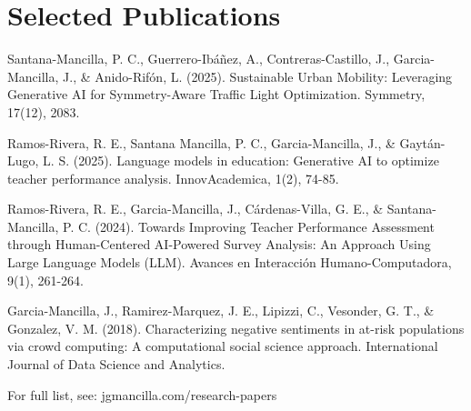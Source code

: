 \documentclass[letterpaper,10pt]{article}
\newcommand{\resumeSubHeadingListStart}{\begin{itemize}[leftmargin=0.15in, label={}]}
\newcommand{\resumeSubHeadingListEnd}{\end{itemize}}
\begin{document}
\section{Selected Publications}
  \resumeSubHeadingListStart
    \small{\item{
      {Santana-Mancilla, P. C., Guerrero-Ibáñez, A., Contreras-Castillo, J., Garcia-Mancilla, J., \& Anido-Rifón, L. (2025). Sustainable Urban Mobility: Leveraging Generative AI for Symmetry-Aware Traffic Light Optimization. Symmetry, 17(12), 2083.}
      
      {Ramos-Rivera, R. E., Santana Mancilla, P. C., Garcia-Mancilla, J., \& Gaytán-Lugo, L. S. (2025). Language models in education: Generative AI to optimize teacher performance analysis. InnovAcademica, 1(2), 74-85.}
    
      {Ramos-Rivera, R. E., Garcia-Mancilla, J., Cárdenas-Villa, G. E., \& Santana-Mancilla, P. C. (2024). Towards Improving Teacher Performance Assessment through Human-Centered AI-Powered Survey Analysis: An Approach Using Large Language Models (LLM). Avances en Interacción Humano-Computadora, 9(1), 261-264.}
    
      {Garcia-Mancilla, J., Ramirez-Marquez, J. E., Lipizzi, C., Vesonder, G. T., \& Gonzalez, V. M. (2018). Characterizing negative sentiments in at-risk populations via crowd computing: A computational social science approach. International Journal of Data Science and Analytics.}
        
      {\small For full list, see: jgmancilla.com/research-papers }
  }}
  \resumeSubHeadingListEnd
\end{document}

